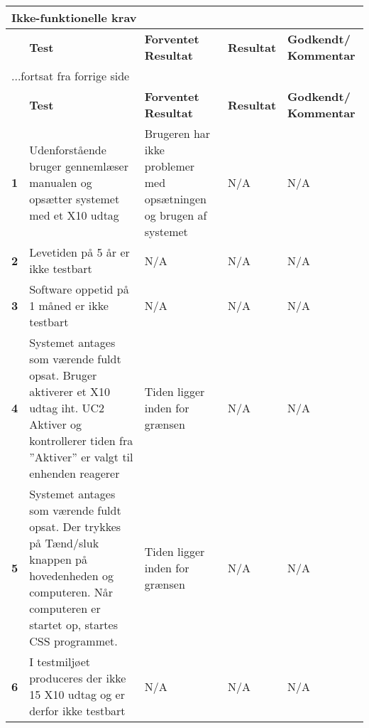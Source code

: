 
\begin{center}
\begin{longtable}{|p{}|p{}|p{}|p{}|p{}|} %
\hline
\multicolumn{5}{|l|}{\textbf{Ikke-funktionelle krav}} \\ \hline
\multicolumn{1}{|c|}{} &
\textbf{Test} &
\textbf{Forventet \newline Resultat} &
\textbf{Resultat} &
\textbf{Godkendt/ \newline Kommentar} \\ \hline 
\endfirsthead

\multicolumn{5}{l}{...fortsat fra forrige side} \\ \hline 
\multicolumn{1}{|c|}{} &
\textbf{Test} &
\textbf{Forventet \newline Resultat} &
\textbf{Resultat} &
\textbf{Godkendt/ \newline Kommentar} \\ \hline 
\endhead


\textbf{1} &
Udenforstående bruger gennemlæser manualen og opsætter systemet med et X10 udtag &
Brugeren har ikke problemer med opsætningen og brugen af systemet &
N/A &
N/A \\\hline

\textbf{2} &
Levetiden på 5 år er ikke testbart &
N/A &
N/A &
N/A \\\hline

\textbf{3} &
Software oppetid på 1 måned er ikke testbart &
N/A &
N/A &
N/A \\\hline

\textbf{4} &
Systemet antages som værende fuldt opsat.\newline
Bruger aktiverer et X10 udtag iht. UC2 Aktiver og kontrollerer tiden fra ''Aktiver'' er valgt til enhenden reagerer&
Tiden ligger inden for grænsen &
N/A &
N/A \\\hline

\textbf{5} &
Systemet antages som værende fuldt opsat.\newline
Der trykkes på Tænd/sluk knappen på hovedenheden og computeren. Når computeren er startet op, startes CSS programmet. &
Tiden ligger inden for grænsen &
N/A &
N/A \\\hline

\textbf{6} &
I testmiljøet produceres der ikke 15 X10 udtag og er derfor ikke testbart &
N/A  &
N/A &
N/A \\\hline


\end{longtable}
\end{center}
